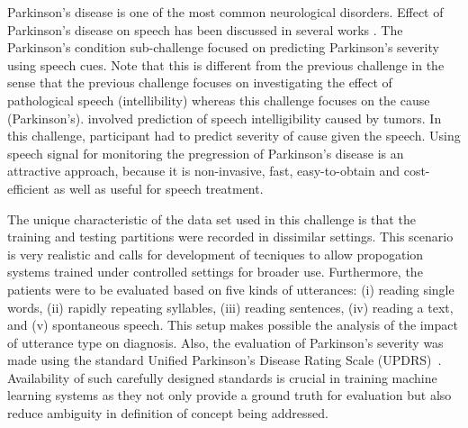 \documentclass{article}
\begin{document}
Parkinson's disease is one of the most common neurological disorders.
Effect of Parkinson's disease on speech has been discussed in several works \cite{lieberman1992speech,kempler2002effect}.
The Parkinson's condition sub-challenge focused on predicting Parkinson's severity using speech cues.
Note that this is different from the previous challenge in the sense that the previous challenge focuses on investigating the effect of pathological speech (intellibility) whereas this challenge focuses on the cause (Parkinson's). 
involved prediction of speech intelligibility caused by tumors.
In this challenge, participant had to predict severity of cause given the speech.
Using speech signal for monitoring the pregression of Parkinson's disease is an attractive approach, because it is non-invasive, fast, easy-to-obtain and cost-efficient as well as useful for speech treatment.

The unique characteristic of the data set used in this challenge is that the training and testing partitions were recorded in dissimilar settings.
This scenario is very realistic and calls for development of tecniques to allow propogation systems trained under controlled settings for broader use.
Furthermore, the patients were to be evaluated based on five kinds of utterances: (i) reading single words, (ii) rapidly repeating syllables, (iii) reading sentences, (iv) reading a text, and (v) spontaneous speech.
This setup makes possible the analysis of the impact of utterance type on diagnosis.
Also, the evaluation of Parkinson's severity was made using the standard Unified Parkinson's Disease Rating Scale (UPDRS)~\cite{stebbins1998factor}.
Availability of such carefully designed standards is crucial in training machine learning systems as they not only provide a ground truth for evaluation but also reduce ambiguity in definition of concept being addressed.
\end{document}
